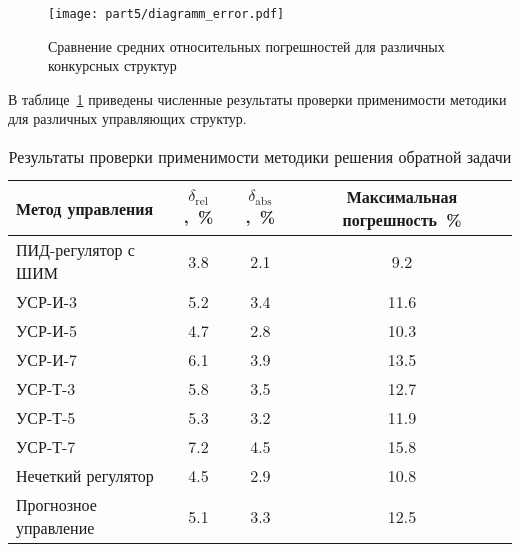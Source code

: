 \begin{figure}[h]
	\centering
	\texttt{[image: part5/diagramm\_error.pdf]}
	\caption{Сравнение средних относительных погрешностей для различных конкурсных структур}
	\label{fig:verification_diagram}
\end{figure}

В таблице~\ref{tab:verification_results} приведены численные результаты
проверки применимости методики для различных управляющих структур.

\begin{table}[ht]
	\centering
	\caption{Результаты проверки применимости методики решения обратной задачи}
	\label{tab:verification_results}
	\small
	\begin{tabular}{lccc}
		\midrule
		\textbf{Метод управления} & $\delta_{\text{rel}}$,~\% & $\delta_{\text{abs}}$,~\% & \textbf{Максимальная погрешность}~\% \\
		\midrule
		ПИД-регулятор с ШИМ       & \num{3.8}                 & \num{2.1}                 & \num{9.2}                            \\
		УСР-И-3                   & \num{5.2}                 & \num{3.4}                 & \num{11.6}                           \\
		УСР-И-5                   & \num{4.7}                 & \num{2.8}                 & \num{10.3}                           \\
		УСР-И-7                   & \num{6.1}                 & \num{3.9}                 & \num{13.5}                           \\
		УСР-Т-3                   & \num{5.8}                 & \num{3.5}                 & \num{12.7}                           \\
		УСР-Т-5                   & \num{5.3}                 & \num{3.2}                 & \num{11.9}                           \\
		УСР-Т-7                   & \num{7.2}                 & \num{4.5}                 & \num{15.8}                           \\
		Нечеткий регулятор        & \num{4.5}                 & \num{2.9}                 & \num{10.8}                           \\
		Прогнозное управление     & \num{5.1}                 & \num{3.3}                 & \num{12.5}                           \\
		\midrule
	\end{tabular}
\end{table}

